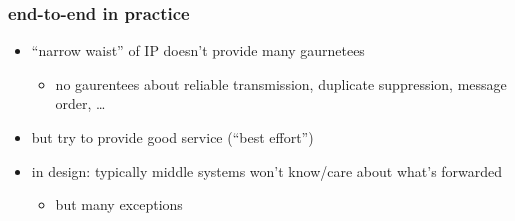 
\begin{frame}\frametitle{end-to-end in practice}
    \begin{itemize}
    \item ``narrow waist'' of IP doesn't provide many gaurnetees
        \begin{itemize}
        \item no gaurentees about reliable transmission, duplicate suppression, message order, \ldots
        \end{itemize}
    \item but try to provide good service (``best effort'')
    \vspace{.5cm}
    \item in design: typically middle systems won't know/care about what's forwarded
        \begin{itemize}
        \item but many exceptions
        \end{itemize}
    \end{itemize}
\end{frame}
